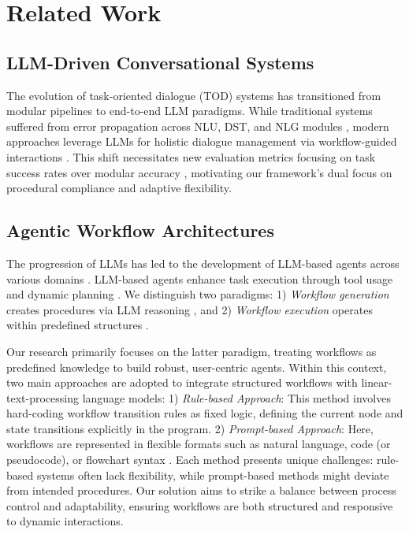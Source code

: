 \section{Related Work} 
\subsection{LLM-Driven Conversational Systems} \label{subsec:llm-tod} 
The evolution of task-oriented dialogue (TOD) systems has transitioned from modular pipelines \citep{LLM-dialogue-survey} to end-to-end LLM paradigms. While traditional systems suffered from error propagation across NLU, DST, and NLG modules \citep{SPACE-3,PPTOD}, modern approaches leverage LLMs for holistic dialogue management via workflow-guided interactions \citep{FlowBench,SystemPrompt}. 
This shift necessitates new evaluation metrics focusing on task success rates over modular accuracy \citep{DAG-test-gen}, motivating our framework's dual focus on procedural compliance and adaptive flexibility.


\subsection{Agentic Workflow Architectures} 
The progression of LLMs has led to the development of LLM-based agents across various domains \citep{GenerativeAgents,MedAgents,ChatDev}.
LLM-based agents enhance task execution through tool usage and dynamic planning \citep{ReAct,Toolformer,KnowledGPT,KnowAgent}. We distinguish two paradigms: 1) \emph{Workflow generation} creates procedures via LLM reasoning \citep{AutoFlow,CoRE,LLM+P,AutoAgents,PlanBench}, and 2) \emph{Workflow execution} operates within predefined structures \citep{FlowBench,WorFBench}. 

Our research primarily focuses on the latter paradigm, treating workflows as predefined knowledge to build robust, user-centric agents. Within this context, two main approaches are adopted to integrate structured workflows with linear-text-processing language models: 
1) \emph{Rule-based Approach}: This method involves hard-coding workflow transition rules as fixed logic, defining the current node and state transitions explicitly in the program.
2) \emph{Prompt-based Approach}: Here, workflows are represented in flexible formats such as natural language, code (or pseudocode), or flowchart syntax \citep{FlowBench,KnowAgent}.
Each method presents unique challenges: rule-based systems often lack flexibility, while prompt-based methods might deviate from intended procedures. Our solution aims to strike a balance between process control and adaptability, ensuring workflows are both structured and responsive to dynamic interactions.
